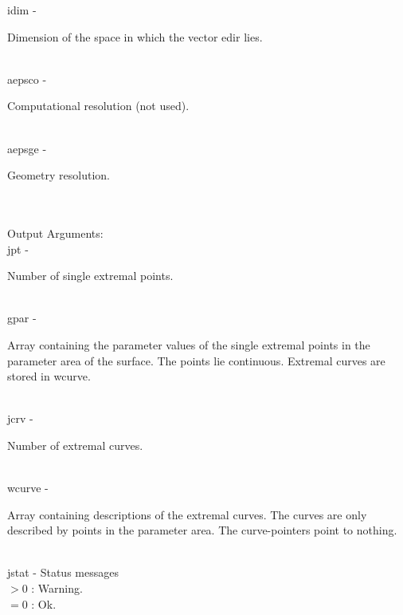         \>\>    {\fov idim}\> - \>  \begin{minipg2}
                     Dimension of the space in which the vector {\fov edir}
                       lies.
                               \end{minipg2}\\
        \>\>    {\fov aepsco}\> - \>  \begin{minipg2}
                     Computational resolution (not used).
                               \end{minipg2}\\
        \>\>    {\fov aepsge}\> - \>  \begin{minipg2}
                     Geometry resolution.
                               \end{minipg2}\\
\\
        \>Output Arguments:\\
        \>\>    {\fov jpt}\> - \>  \begin{minipg2}
                     Number of single extremal points.
                               \end{minipg2}\\
        \>\>    {\fov gpar}\> - \>
        \begin{minipg2}
          Array containing the parameter values of the
          single extremal points in the parameter
          area of the surface. The points lie continuous.
          Extremal curves are stored in {\fov wcurve}.
        \end{minipg2}\\[0.8ex]
        \>\>    {\fov jcrv}\> - \>  \begin{minipg2}
                     Number of extremal curves.
                               \end{minipg2}\\
        \>\>    {\fov wcurve}\> - \>
        \begin{minipg2}
          Array containing descriptions of the extremal
          curves. The curves are only described by points
          in the parameter area. The curve-pointers point
          to nothing.
        \end{minipg2}\\[0.8ex]
\newpagetabs
        \>\>    {\fov jstat}     \> - \> Status messages\\
                \>\>\>\>              $> 0$ \> : Warning.\\
                \>\>\>\>              $= 0$ \> : Ok.\\
